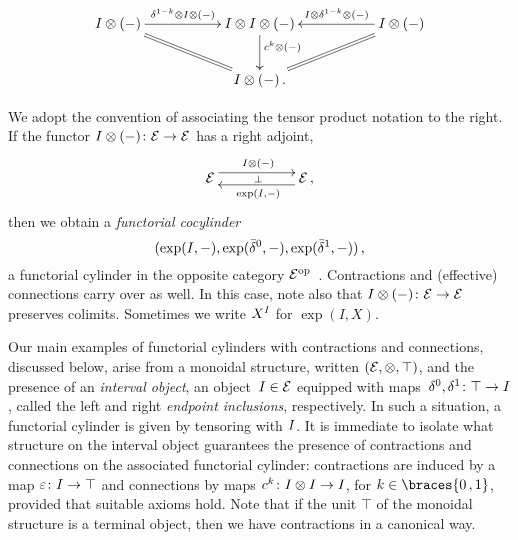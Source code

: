 \documentclass[reqno,10pt,a4paper,oneside,draft]{amsart}
\begin{document}
\begin{equation} \label{connections:1}
\begin{gathered}
\xymatrix@C+3em{
  \interval \otimes (-)
  \ar[r]^-{\kcylinv \otimes \interval \otimes (-)}
  \ar@{=}[dr]
&
  \interval \otimes \interval \otimes (-)
  \ar[d]^(0.4){c^k \otimes (-)}
&
  \interval \otimes (-)
  \ar[l]_-{\interval \otimes \kcylinv \otimes (-)}
  \ar@{=}[dl]
\\&
  \interval \otimes (-) \, .
}
\end{gathered}
\end{equation}

We adopt the convention of associating the tensor product notation to the right.
If the functor $I\otimes (-) \colon \mathcal{E} \to \mathcal{E}$ has a right adjoint,
\begin{equation}
\label{equ:cyl-exp-adj}
\begin{gathered}
\xymatrix@C+3em{
\catE \ar@<1ex>[r]^{\interval\otimes (-)} \ar@{}[r]|{\bot} & \catE \, , \ar@<1ex>[l]^{\exp(I, -)} }
\end{gathered}
\end{equation}
then we obtain a \emph{functorial cocylinder}
\[
(\exp(I, -), \exp(\bar{\delta}^0, -), \exp(\bar{\delta}^1, -)) \, ,
\]
\ie a functorial cylinder in the opposite category $\mathcal{E}^{\operatorname{op}}$~\cite{kamps-porter:homotopy}.
Contractions and (effective) connections carry over as well.
In this case, note also that $I\otimes (-) \colon \mathcal{E} \to \mathcal{E}$ preserves colimits.
Sometimes we write $X^I$ for $\exp(I, X)$. 

Our main examples of functorial cylinders with contractions and connections, discussed below, arise from a monoidal structure, written $(\mathcal{E}, \otimes, \top)$, and the presence of an \emph{interval object}, \ie an object~$I \in \mathcal{E}$ equipped with maps~$\delta^0, \delta^1 \colon \top \to I$, called the left and right \emph{endpoint inclusions}, respectively.
In such a situation, a functorial cylinder is given by tensoring with $I$.
It is immediate to isolate what structure on the interval object guarantees the presence of contractions and connections on the associated functorial cylinder: contractions are induced by a map $\varepsilon \colon I \to \top$ and connections by maps $c^k \colon I \otimes I \to I$, for $k \in \braces{0\,, 1}$, provided that suitable axioms hold.
Note that if the unit $\top$ of the monoidal structure is a terminal object, then we have contractions in a canonical way.
\end{document}
